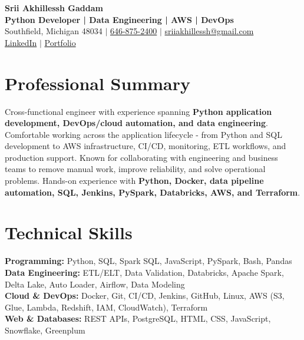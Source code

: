\documentclass[letterpaper,10pt]{article}
\begin{document}
\fontsize{9.35pt}{10.45pt}\selectfont

\begin{center}
    {\LARGE \textbf{Srii Akhillessh Gaddam}} \\[-1pt]
    \textbf{Python Developer | Data Engineering | AWS | DevOps} \\[2pt]
    Southfield, Michigan 48034 $|$
    \href{tel:6468752400}{646-875-2400} $|$
    \href{mailto:sriiakhillessh@gmail.com}{sriiakhillessh@gmail.com} \\[1pt]
    \href{https://www.linkedin.com/in/srii-akhiilessh-gaddam-b48668191/}{LinkedIn} $|$
    \href{https://sriiakhillesshg.github.io/portfolio/}{Portfolio}
\end{center}
\vspace{-8pt}

\section{Professional Summary}
\small{Cross-functional engineer with experience spanning \textbf{Python application development, DevOps/cloud automation, and data engineering}. Comfortable working across the application lifecycle - from Python and SQL development to AWS infrastructure, CI/CD, monitoring, ETL workflows, and production support. Known for collaborating with engineering and business teams to remove manual work, improve reliability, and solve operational problems. Hands-on experience with \textbf{Python, Docker, data pipeline automation, SQL, Jenkins, PySpark, Databricks, AWS, and Terraform}.}

\section{Technical Skills}
\small{
\textbf{Programming:} Python, SQL, Spark SQL, JavaScript, PySpark, Bash, Pandas \\
\textbf{Data Engineering:} ETL/ELT, Data Validation, Databricks, Apache Spark, Delta Lake, Auto Loader, Airflow, Data Modeling \\
\textbf{Cloud \& DevOps:} Docker, Git, CI/CD, Jenkins, GitHub, Linux, AWS (S3, Glue, Lambda, Redshift, IAM, CloudWatch), Terraform \\
\textbf{Web \& Databases:} REST APIs, PostgreSQL, HTML, CSS, JavaScript, Snowflake, Greenplum
}
\end{document}
